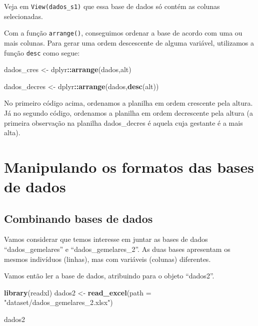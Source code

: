 \documentclass[
]{book}
\newenvironment{Shaded}{\begin{snugshade}}{\end{snugshade}}
\newcommand{\DataTypeTok}[1]{\textcolor[rgb]{0.13,0.29,0.53}{#1}}
\newcommand{\KeywordTok}[1]{\textcolor[rgb]{0.13,0.29,0.53}{\textbf{#1}}}
\newcommand{\NormalTok}[1]{#1}
\newcommand{\OperatorTok}[1]{\textcolor[rgb]{0.81,0.36,0.00}{\textbf{#1}}}
\newcommand{\StringTok}[1]{\textcolor[rgb]{0.31,0.60,0.02}{#1}}
\begin{document}
Veja em \texttt{View(dados\_s1)} que essa base de dados só contém as colunas selecionadas.

Com a função \texttt{arrange()}, conseguimos ordenar a base de acordo com uma ou mais colunas. Para gerar uma ordem descescente de alguma variável, utilizamos a função \texttt{desc} como segue:

\begin{Shaded}
\begin{Highlighting}[]
\NormalTok{dados_cres <-}\StringTok{ }\NormalTok{dplyr}\OperatorTok{::}\KeywordTok{arrange}\NormalTok{(dados,alt)}
\end{Highlighting}
\end{Shaded}

\begin{Shaded}
\begin{Highlighting}[]
\NormalTok{dados_decres <-}\StringTok{ }\NormalTok{dplyr}\OperatorTok{::}\KeywordTok{arrange}\NormalTok{(dados,}\KeywordTok{desc}\NormalTok{(alt))}
\end{Highlighting}
\end{Shaded}

No primeiro código acima, ordenamos a planilha em ordem crescente pela altura. Já no segundo código, ordenamos a planilha em ordem decrescente pela altura (a primeira observação na planilha dados\_decres é aquela cuja gestante é a mais alta).

\hypertarget{manipulando-os-formatos-das-bases-de-dados}{%
\section{Manipulando os formatos das bases de dados}\label{manipulando-os-formatos-das-bases-de-dados}}

\hypertarget{combinando-bases-de-dados}{%
\subsection{Combinando bases de dados}\label{combinando-bases-de-dados}}

Vamos considerar que temos interesse em juntar as bases de dados ``dados\_gemelares'' e ``dados\_gemelares\_2''. As duas bases apresentam os mesmos indivíduos (linhas), mas com variáveis (colunas) diferentes.

Vamos então ler a base de dados, atribuindo para o objeto ``dados2''.

\begin{Shaded}
\begin{Highlighting}[]
\KeywordTok{library}\NormalTok{(readxl)}
\NormalTok{dados2 <-}\StringTok{ }\KeywordTok{read_excel}\NormalTok{(}\DataTypeTok{path =} \StringTok{"dataset/dados_gemelares_2.xlsx"}\NormalTok{)}

\NormalTok{dados2}
\end{Highlighting}
\end{Shaded}
\end{document}
